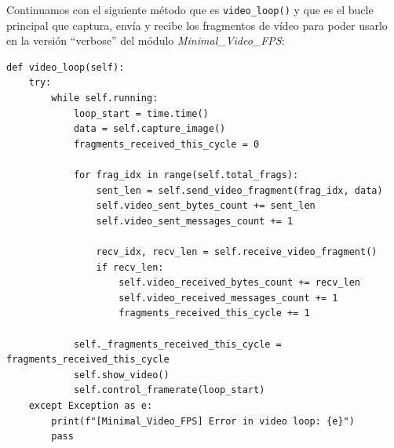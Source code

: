 Continuamos con el siguiente método que es \texttt{video\_loop()} y que es el bucle principal que captura, envía y recibe los fragmentos de vídeo para poder usarlo en la versión ``verbose'' del módulo \textit{Minimal\_Video\_FPS}:
\begin{lstlisting}[style=pythonstyle, caption={Método \texttt{video\_loop()}.}, label={lst:video_loop_verbose}]
def video_loop(self):
    try:
        while self.running:
            loop_start = time.time()
            data = self.capture_image()
            fragments_received_this_cycle = 0

            for frag_idx in range(self.total_frags):
                sent_len = self.send_video_fragment(frag_idx, data)
                self.video_sent_bytes_count += sent_len
                self.video_sent_messages_count += 1

                recv_idx, recv_len = self.receive_video_fragment()
                if recv_len:
                    self.video_received_bytes_count += recv_len
                    self.video_received_messages_count += 1
                    fragments_received_this_cycle += 1

            self._fragments_received_this_cycle = fragments_received_this_cycle
            self.show_video()
            self.control_framerate(loop_start)
    except Exception as e:
        print(f"[Minimal_Video_FPS] Error in video loop: {e}")
        pass
\end{lstlisting}
\vspace{\baselineskip}

